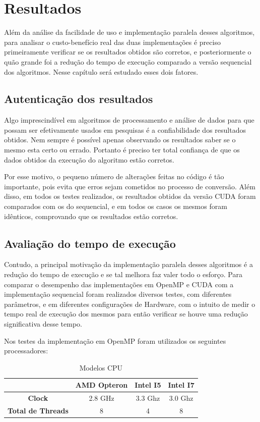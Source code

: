 \chapter{Resultados}

Além da análise da facilidade de uso e implementação paralela desses algoritmos, para analisar o custo-benefício real das duas implementações é preciso primeiramente verificar se os resultados obtidos são corretos, e posteriormente o quão grande foi a redução do tempo de execução comparado a versão sequencial dos algoritmos. Nesse capítulo será estudado esses dois fatores.

\section{Autenticação dos resultados}

Algo imprescindível em algoritmos de processamento e análise de dados para que possam ser efetivamente usados em pesquisas é a confiabilidade dos resultados obtidos. Nem sempre é possível apenas observando os resultados saber se o mesmo esta certo ou errado. Portanto é preciso ter total confiança de que os dados obtidos da execução do algoritmo estão corretos.

Por esse motivo, o pequeno número de alterações feitas no código é tão importante, pois evita que erros sejam cometidos no processo de conversão. Além disso, em todos os testes realizados, os resultados obtidos da versão CUDA foram comparados com os do sequencial, e em todos os casos os mesmos foram idênticos, comprovando que os resultados estão corretos.

\section{Avaliação do tempo de execução}

Contudo, a principal motivação da implementação paralela desses algoritmos é a redução do tempo de execução e se tal melhora faz valer todo o esforço. Para comparar o desempenho das implementações em OpenMP e CUDA com a implementação sequencial foram realizados diversos testes, com diferentes parâmetros, e em diferentes configurações de Hardware, com o intuito de medir o tempo real de execução dos mesmos para então verificar se houve uma redução significativa desse tempo.

Nos testes da implementação em OpenMP foram utilizados os seguintes processadores:

\begin{table}[H]
\caption{Modelos CPU}
\begin{center}
\begin{tabular}{cccc}
 & \textbf{AMD Opteron} & \textbf{Intel I5} & \textbf{Intel I7} \\
\hline\hline
\textbf{Clock}				& 2.8 GHz	& 3.3 Ghz	& 3.0 Ghz \\
\textbf{Total de Threads}	& 8			& 4			& 8
\end{tabular} 
\end{center}
\end{table}

